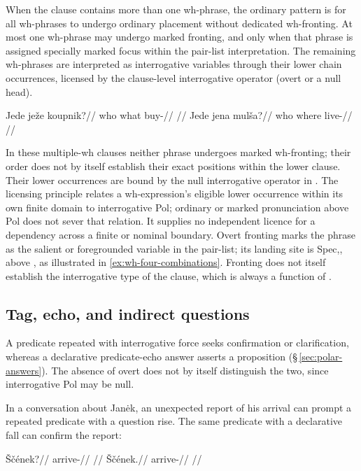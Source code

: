 When the clause contains more than one wh-phrase, the ordinary pattern is for
all wh-phrases to undergo ordinary placement without dedicated wh-fronting.
At most one wh-phrase may undergo marked fronting,
and only when that phrase is assigned specially marked focus
within the pair-list interpretation. The remaining wh-phrases are interpreted as
interrogative variables through their lower chain occurrences, licensed by the clause-level
interrogative operator (overt  or a null  head).

\pex
\a
\begingl
\gla Jede ježe koupnik?//
\glb who what buy-\Pf{}//
\glft {}//
\endgl
\a
\begingl
\gla Jede jena mulša?//
\glb who where live-\Cont{}//
\glft {}//
\endgl
\xe

\noindent In these multiple-wh clauses neither phrase undergoes marked
wh-fronting; their order does not by itself establish their exact positions
within the lower clause. Their lower occurrences are bound by the null interrogative
operator in . The licensing principle relates a wh-expression's eligible lower occurrence
within its own finite domain to interrogative Pol; ordinary or marked
pronunciation above Pol does not sever that relation. It supplies no
independent licence for a dependency across a finite or nominal boundary.
Overt fronting marks the phrase as the salient or
foregrounded variable in the pair-list; its landing site is Spec,, above , as
illustrated in \ref{ex:wh-four-combinations}. Fronting does not itself establish the
interrogative type of the clause, which is always a function of .

\subsection{Tag, echo, and indirect questions}
\label{sec:th-tag-echo}

A predicate repeated with interrogative force seeks confirmation or
clarification, whereas a declarative predicate-echo answer asserts a
proposition (§\,\ref{sec:polar-answers}). The absence of overt 
does not by itself distinguish the two, since interrogative Pol may be null.

In a conversation about Janėk, an unexpected report of his arrival can
prompt a repeated predicate with a question rise. The same predicate with
a declarative fall can confirm the report:

\pex\label{ex:arrival-echo-question}
\a
\begingl
\gla Ščének?//
\glb arrive-\Pf{}//
\glft {}
//
\endgl
\a
\begingl
\gla Ščének.//
\glb arrive-\Pf{}//
\glft {}
//
\endgl
\xe

